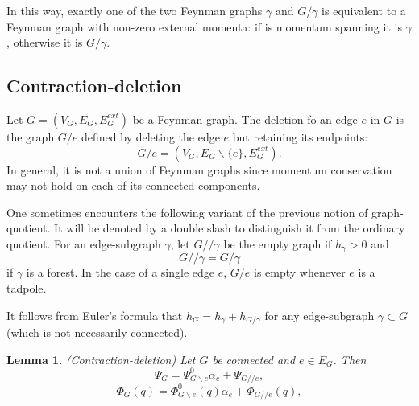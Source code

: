 \documentclass[11pt]{article}
\newtheorem{lemma}[thm]{Lemma}
\begin{document}
In this way, exactly one of the two Feynman graphs $\gamma$ and $G/\gamma$ is equivalent to a Feynman graph with non-zero external momenta: if  is momentum spanning it is $\gamma$, otherwise it is $G/\gamma$.

\subsection{Contraction-deletion}
Let $G=(V_G,E_G,E^{ext}_G)$ be a Feynman graph. The deletion fo an edge $e$ in $G$ is the graph $G/e$ defined by deleting the edge $e$ but retaining its endpoints:
$$
G/e=(V_G,E_G\backslash\{e\}, E^{ext}_G).
$$
In general, it is not a union of Feynman graphs since momentum conservation may not hold on each of its connected components.

One sometimes encounters the following variant of the previous notion of graph-quotient. It will be denoted by a double slash to distinguish it from the ordinary quotient. For an edge-subgraph $\gamma$, let $G//\gamma$ be the empty graph if $h_\gamma>0$ and
$$
G//\gamma=G/\gamma
$$
if $\gamma$ is a forest. In the case of a single edge $e$, $G/e$ is empty whenever $e$ is a tadpole.

It follows from Euler's formula that
$h_G=h_\gamma+h_{G/\gamma}$
for any edge-subgraph $\gamma\subset G$ (which is not necessarily connected).
\begin{lemma}
(Contraction-deletion) Let $G$ be connected and $e\in E_G$. Then
$$
\Psi_G=\Psi_{G\backslash e}^0\alpha_e+\Psi_{G//e},
$$
$$
\Phi_G(q)=\Phi^0_{G\backslash e}(q)\alpha_e+\Phi_{G//e}(q),
$$
\end{lemma}
\end{document}
